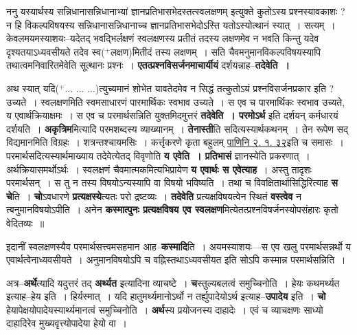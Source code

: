 \documentclass[article,12pt,a4paper]{memoir}
\newcommand{\add}[1]{($^{+}$#1)}
\begin{document}
	  \pstart ननु यस्यार्थस्य सन्निधानासन्निधानाभ्यां ज्ञानप्रतिभासभेदस्तत्स्वलक्षणम् इत्युक्ते कुतोऽस्य प्रश्नस्यावकाशः ? न हि विकल्पविषयस्य सन्निधानासन्निधानाच्च ज्ञानप्रतिभासभेदोऽस्ति यतोऽस्योत्थानं स्यात् । सत्यम् । केवलमयमस्याशयः--यदेतद् भवद्भिर्लक्षणं स्वलक्षणस्य प्रतीतं तदस्य लक्षणमेव न भवति किन्तु यदेव दृश्यतयाऽध्यवसीयते तदेव स्व\add{लक्षण}मितीदं तस्य लक्षणम् । सति चैवमनुमानविकल्पविषयस्यापि तथात्वमनिवारितमेवेति सूत्थानः प्रश्नः । \textbf{एतत्प्रश्नविसर्जनमाचार्यीयं} दर्शयन्नाह--\textbf{तदेवेति ।}
	\pend
      

	  \pstart अथ स्यात् यदि\add{... ... ...}त्युच्यमानं शोभेत यावतेदमेव न सिद्धं तत्कुतोऽयं प्रश्नविसर्जनप्रकार इति ? उच्यते । स्वलक्षणमिति स्वमसाधारणं पारमार्थिकः स्वभाव उच्यते । स एव च पारमार्थिकः स्वभाव उच्यते, य एवार्थक्रियाक्षमः । स एव च परमार्थसन्निति युक्तमिदमुत्तरं \textbf{तदेवेति । परमोऽर्थ} इति दर्शयन् कर्मधारयं दर्शयति । \textbf{अकृत्रिम}मित्यादि परमशब्दस्य व्याख्यानम् । \textbf{तेनास्ती}ति सदित्यस्यार्थकथनम् । तेन रूपेण सद् विद्यमानमिति विग्रहः । शत्रन्तश्चायमसिः । कर्त्तृकरणे कृता बहुलम् \href{http://sarit.indology.info/?cref=Pā.2.1.32}{पाणिनि २. १. ३२}इति च समासः । परमार्थसदित्यस्यार्थमाख्याय तदेवेत्येतद् विवृणोति \textbf{य एवेति । प्रतिभासं} ज्ञानस्येति प्रकरणात् । अर्थक्रियासमर्थोऽर्थः । स्वलक्षणं चैवमात्मकमित्यभिप्रायेण \textbf{य एवार्थः स एवेत्याह} । अस्तु तादृशः परमार्थसन् । स तु न तस्य विषयोऽन्यस्यापि वा विषयो भविष्यति । तथा च विवक्षितार्थासिद्धिरित्याह \textbf{स चे}ति । \textbf{चो}ऽवधारणे \textbf{प्रत्यक्षस्ये}त्यतः परो द्रष्टव्यः । \textbf{तदेवेति} प्रत्यक्षविषयत्वेन स्थितं \textbf{वस्त्वेव} न त्बनुमानविषयोऽपीति । अनेन \textbf{कस्मात्पुनः प्रत्यक्षविषय एव स्वलक्षण}मित्येतत्प्रश्नविषर्जनस्योपसंहारः कृतो वेदितव्यः ॥
	\pend
      

	  \pstart इदानीं स्वलक्षणस्यैव परमार्थसत्त्वमसहमान आह--\textbf{कस्मादि}ति । अयमस्याशयः—स एव खलु परमार्थसन्नर्थो य एवार्थत्वेनाध्यवसीयते । अनुमानविषयोऽपि च वह्निस्तथाऽध्यवसीयत इति सोऽपि कस्मान्न परमा\leavevmode{}र्थसन्निति ।
	\pend
      

	  \pstart अत्र--\textbf{अर्थे}त्यादि यदुत्तरं तद् \textbf{अर्थ्यत} इत्यादिना व्याचष्टे । \textbf{च}स्तुल्यबलत्वं समुच्चिनोति । हेयः कथमर्थ्यत इत्याह--हेय इति । हिर्यस्मात् । यदि हातुमर्थ्यमानोऽर्थो न तर्ह्युपादेयोऽर्थ इत्याह--\textbf{उपादेय} इति । \textbf{चो} हेयापेक्षयोपादेयस्यार्थ्यमानत्वं समुच्चिनोति । \textbf{अर्थ}स्य प्रयोजनस्य दाहादेः । एवं च व्याचक्षणः साध्यो दाहादिरेव मुख्यवृत्त्योपादेया हेयो वा । \leavevmode{} 
	  
\end{document}
